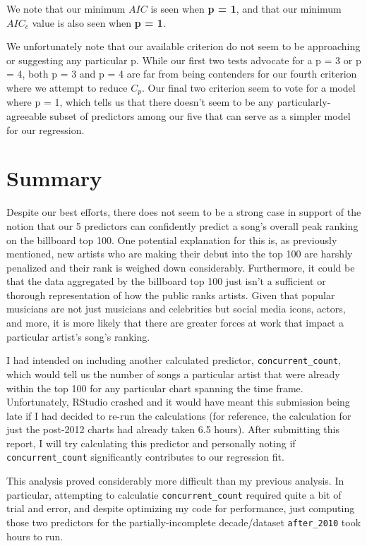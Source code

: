 \documentclass[11pt]{article} %
\begin{document}
We note that our minimum $AIC$ is seen when \textbf{p = 1}, and that our minimum $AIC_{c}$ value is also seen when \textbf{p = 1}.

We unfortunately note that our available criterion do not seem to be approaching or suggesting any particular p. While our first two tests advocate for a p = 3 or p = 4, both p = 3 and p = 4 are far from being contenders for our fourth criterion where we attempt to reduce $C_{p}$. Our final two criterion seem to vote for a model where p = 1, which tells us that there doesn't seem to be any particularly-agreeable subset of predictors among our five that can serve as a simpler model for our regression.

\section*{Summary}
Despite our best efforts, there does not seem to be a strong case in support of the notion that our 5 predictors can confidently predict a song's overall peak ranking on the billboard top 100. One potential explanation for this is, as previously mentioned, new artists who are making their debut into the top 100 are harshly penalized and their rank is weighed down considerably. Furthermore, it could be that the data aggregated by the billboard top 100 just isn't a sufficient or thorough representation of how the public ranks artists. Given that popular musicians are not just musicians and celebrities but social media icons, actors, and more, it is more likely that there are greater forces at work that impact a particular artist's song's ranking.

I had intended on including another calculated predictor, \texttt{concurrent\_count}, which would tell us the number of songs a particular artist that were already within the top 100 for any particular chart spanning the time frame. Unfortunately, RStudio crashed and it would have meant this submission being late if I had decided to re-run the calculations (for reference, the calculation for just the post-2012 charts had already taken 6.5 hours). After submitting this report, I will try calculating this predictor and personally noting if \texttt{concurrent\_count} significantly contributes to our regression fit.

This analysis proved considerably more difficult than my previous analysis. In particular, attempting to calculatie \texttt{concurrent\_count} required quite a bit of trial and error, and despite optimizing my code for performance, just computing those two predictors for the partially-incomplete decade/dataset \texttt{after\_2010} took hours to run.
\end{document}
